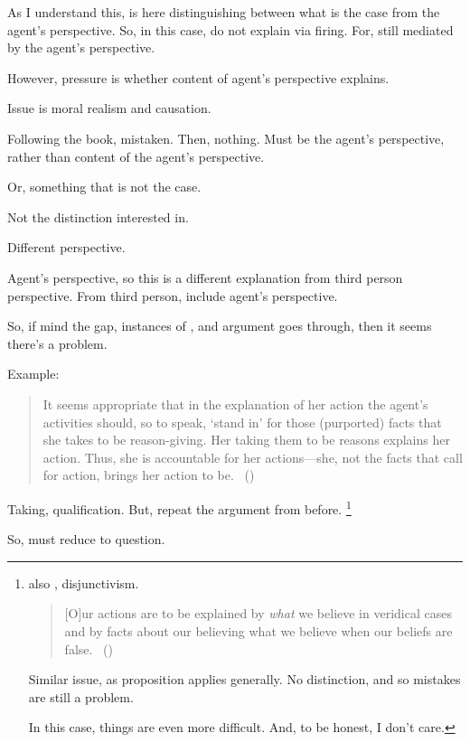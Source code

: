 \begin{note}
  As I understand this, \citeauthor{Dancy:2000aa} is here distinguishing between what is the case from the agent's perspective.
  So, in this case, do not explain via firing.
  For, still mediated by the agent's perspective.

  However, pressure is whether content of agent's perspective explains.

  Issue is moral realism and causation.

  Following the book, mistaken.
  Then, nothing.
  Must be the agent's perspective, rather than content of the agent's perspective.

  Or, something that is not the case.

  Not the distinction interested in.

  Different perspective.

  Agent's perspective, so this is a different explanation from third person perspective.
  From third person, include agent's perspective.

  So, if mind the gap, instances of \qzS{}, and argument goes through, then it seems there's a problem.
\end{note}

\begin{note}
  Example:

  \citeauthor{Hieronymi:2011aa}
  \begin{quote}
    It seems appropriate that in the explanation of her action the agent’s activities should, so to speak, ‘stand in’ for those (purported) facts that she takes to be reason-giving.
    Her taking them to be reasons explains her action.
    Thus, she is accountable for her actions---she, not the facts that call for action, brings her action to be.%
    \mbox{ }\hfill\mbox{(\citeyear[425]{Hieronymi:2011aa})}
  \end{quote}

  Taking, qualification.
  But, repeat the argument from before.%
  \footnote{
    \citeauthor{DOro:2013vh} also \citeauthor{Alvarez:2010to}, disjunctivism.
    \begin{quote}
      [O]ur actions are to be explained by \emph{what} we believe in veridical cases and by facts about our believing what we believe when our beliefs are false.%
      \mbox{ }\hfill\mbox{(\citeyear[30]{DOro:2013vh})}
    \end{quote}
    Similar issue, as proposition applies generally.
    No distinction, and so mistakes are still a problem.

    In this case, things are even more difficult.
    And, to be honest, I don't care.
  }

  So, must reduce to question.
\end{note}

